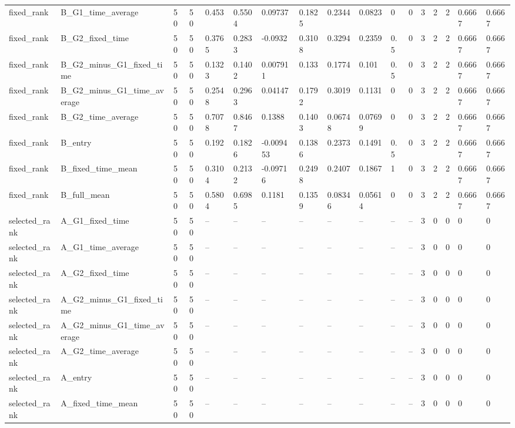 \begin{longtable}{lllllllllllllllll}
fixed\_rank & B\_G1\_time\_average & 50 & 50 & 0.453 & 0.5504 & 0.09737 & 0.1825 & 0.2344 & 0.0823 & 0 & 0 & 3 & 2 & 2 & 0.6667 & 0.6667 \\
fixed\_rank & B\_G2\_fixed\_time & 50 & 50 & 0.3765 & 0.2833 & -0.0932 & 0.3108 & 0.3294 & 0.2359 & 0.5 & 0 & 3 & 2 & 2 & 0.6667 & 0.6667 \\
fixed\_rank & B\_G2\_minus\_G1\_fixed\_time & 50 & 50 & 0.1323 & 0.1402 & 0.007911 & 0.133 & 0.1774 & 0.101 & 0.5 & 0 & 3 & 2 & 2 & 0.6667 & 0.6667 \\
fixed\_rank & B\_G2\_minus\_G1\_time\_average & 50 & 50 & 0.2548 & 0.2963 & 0.04147 & 0.1792 & 0.3019 & 0.1131 & 0 & 0 & 3 & 2 & 2 & 0.6667 & 0.6667 \\
fixed\_rank & B\_G2\_time\_average & 50 & 50 & 0.7078 & 0.8467 & 0.1388 & 0.1403 & 0.06748 & 0.07699 & 0 & 0 & 3 & 2 & 2 & 0.6667 & 0.6667 \\
fixed\_rank & B\_entry & 50 & 50 & 0.192 & 0.1826 & -0.009453 & 0.1386 & 0.2373 & 0.1491 & 0.5 & 0 & 3 & 2 & 2 & 0.6667 & 0.6667 \\
fixed\_rank & B\_fixed\_time\_mean & 50 & 50 & 0.3104 & 0.2132 & -0.09716 & 0.2498 & 0.2407 & 0.1867 & 1 & 0 & 3 & 2 & 2 & 0.6667 & 0.6667 \\
fixed\_rank & B\_full\_mean & 50 & 50 & 0.5804 & 0.6985 & 0.1181 & 0.1359 & 0.08346 & 0.05614 & 0 & 0 & 3 & 2 & 2 & 0.6667 & 0.6667 \\
selected\_rank & A\_G1\_fixed\_time & 50 & 50 & -- & -- & -- & -- & -- & -- & -- & -- & 3 & 0 & 0 & 0 & 0 \\
selected\_rank & A\_G1\_time\_average & 50 & 50 & -- & -- & -- & -- & -- & -- & -- & -- & 3 & 0 & 0 & 0 & 0 \\
selected\_rank & A\_G2\_fixed\_time & 50 & 50 & -- & -- & -- & -- & -- & -- & -- & -- & 3 & 0 & 0 & 0 & 0 \\
selected\_rank & A\_G2\_minus\_G1\_fixed\_time & 50 & 50 & -- & -- & -- & -- & -- & -- & -- & -- & 3 & 0 & 0 & 0 & 0 \\
selected\_rank & A\_G2\_minus\_G1\_time\_average & 50 & 50 & -- & -- & -- & -- & -- & -- & -- & -- & 3 & 0 & 0 & 0 & 0 \\
selected\_rank & A\_G2\_time\_average & 50 & 50 & -- & -- & -- & -- & -- & -- & -- & -- & 3 & 0 & 0 & 0 & 0 \\
selected\_rank & A\_entry & 50 & 50 & -- & -- & -- & -- & -- & -- & -- & -- & 3 & 0 & 0 & 0 & 0 \\
selected\_rank & A\_fixed\_time\_mean & 50 & 50 & -- & -- & -- & -- & -- & -- & -- & -- & 3 & 0 & 0 & 0 & 0 \\

\end{longtable}
